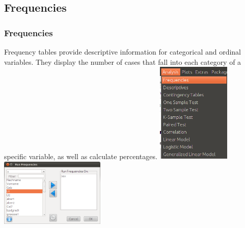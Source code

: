 \documentclass[xcolor={table},c]{beamer}
\begin{document}
\subsection{Frequencies}
\begin{frame}\frametitle{Frequencies}
Frequency tables provide descriptive information for categorical and ordinal variables. They display the number of cases that fall into each category of a specific variable, as well as calculate percentages. 
\includegraphics[width=3.5cm]{frequ1.png} \hspace*{1cm} \includegraphics[width=5cm]{frequ2.png}
\end{frame}
\end{document}
